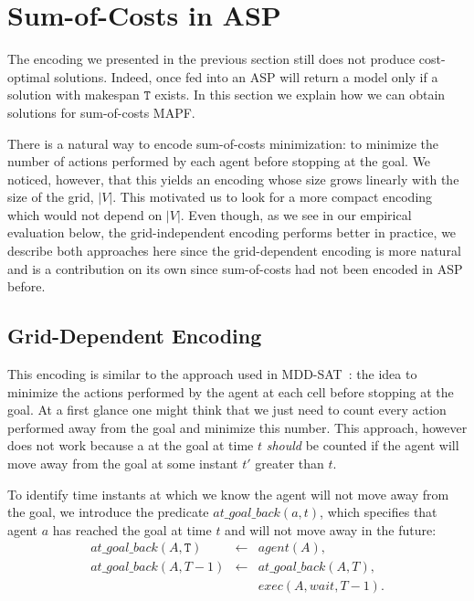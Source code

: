 \section{Sum-of-Costs in ASP}
The encoding we presented in the previous section still does not produce cost-optimal solutions. Indeed, once fed into an ASP will return a model only if a solution with makespan $\mathtt{T}$ exists. In this section we explain how we can obtain solutions for sum-of-costs MAPF.

There is a natural way to encode sum-of-costs minimization: to minimize the number of actions performed by each agent before stopping at the goal. We noticed, however, that this yields an encoding whose size grows linearly with the size of the grid, $|V|$. This motivated us to look for a more compact encoding which would not depend on $|V|$. Even though, as we see in our empirical evaluation below, the grid-independent encoding performs better in practice, we describe both approaches here since the grid-dependent encoding is more natural and is a contribution on its own since sum-of-costs had not been encoded in ASP before.

\subsection{Grid-Dependent Encoding}
This encoding is similar to the approach used in MDD-SAT~\cite{SurynekFSB16}: the idea to minimize the actions performed by the agent at each cell before stopping at the goal. At a first glance one might think that we just need to count every action performed away from the goal and minimize this number. This approach, however does not work because a \Wait at the goal at time $t$ \emph{should} be counted if the agent will move away from the goal at some instant $t'$ greater than $t$.

To identify time instants at which we know the agent will not move away from the goal, we introduce the predicate $at\_goal\_back(a,t)$, which specifies that agent $a$ has reached the goal at time $t$  and will not move away in the future:
{\small\begin{eqnarray*}
    at\_goal\_back(A,\mathtt{T}) &\leftarrow& agent(A), \\
    at\_goal\_back(A,T-1) &\leftarrow &at\_goal\_back(A,T),\\
    &&exec(A,wait,T-1).
  \end{eqnarray*}}

